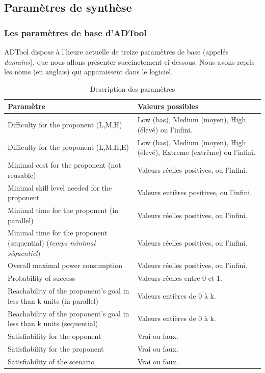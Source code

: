 \subsection{Paramètres de synthèse}

\subsubsection{Les paramètres de base d'ADTool}

ADTool dispose à l'heure actuelle de treize paramètres de base (appelés \textit{domains}), que nous allons présenter succinctement ci-dessous. Nous avons repris les noms (en anglais) qui apparaissent dans le logiciel. 
		
\begin{table}[!h]
	\centering
	\begin{tabular}{|p{6cm}|p{5cm}|}
  \hline
  \textbf{Paramètre} & \textbf{Valeurs possibles} \\
  \hline
  Difficulty for the proponent (L,M,H) & 
 Low (bas), Medium (moyen), High (élevé) ou l'infini.
\\ \hline
Difficulty for the proponent (L,M,H,E) & 
Low (bas), Medium (moyen), High (élevé), Extreme (extrême) ou l'infini.
\\ \hline
Minimal cost for the proponent (not reusable) & 
Valeurs réelles positives, ou l'infini.\\ \hline
  Minimal skill level needed for the proponent
  & Valeurs entières positives, ou l'infini.\\ \hline
  Minimal time for the proponent (in parallel)
  & Valeurs réelles positives, ou l'infini.\\ \hline
  Minimal time for the proponent (sequential) (\textit{temps minimal séquentiel})
  & Valeurs réelles positives, ou l'infini.\\ \hline
  Overall maximal power consumption & 
  Valeurs réelles positives, ou l'infini.\\ \hline
  Probability of success &
  Valeurs réelles entre 0 et 1.\\ \hline
  Reachability of the proponent's goal in less than k units (in parallel)
  & Valeurs entières de 0 à k. \\ \hline
  Reachability of the proponent's goal in less than k units (sequential)
  & Valeurs entières de 0 à k. \\ \hline
  Satisfiability for the opponent
  & Vrai ou faux. \\ \hline
  Satisfiability for the proponent
  & Vrai ou faux. \\ \hline
  Satisfiability of the scenario
  & Vrai ou faux. \\
  \hline
\end{tabular}
	\caption{Description des paramètres}
	\label{tab:DescriptionParam}
\end{table}

